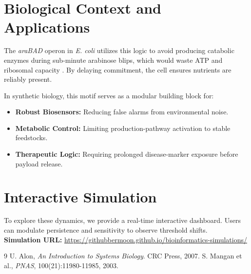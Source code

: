 \documentclass[11pt]{article}
\begin{document}
\section{Biological Context and Applications}
The \textit{araBAD} operon in \textit{E. coli} utilizes this logic to avoid producing catabolic enzymes during sub-minute arabinose blips, which would waste ATP and ribosomal capacity \cite{mangan2003}. By delaying commitment, the cell ensures nutrients are reliably present. 

In synthetic biology, this motif serves as a modular building block for:
\begin{itemize}
    \item \textbf{Robust Biosensors:} Reducing false alarms from environmental noise.
    \item \textbf{Metabolic Control:} Limiting production-pathway activation to stable feedstocks.
    \item \textbf{Therapeutic Logic:} Requiring prolonged disease-marker exposure before payload release.
\end{itemize}

\section{Interactive Simulation}
To explore these dynamics, we provide a real-time interactive dashboard. Users can modulate persistence and sensitivity to observe threshold shifts. 
\\ \textbf{Simulation URL:} \url{https://githubbermoon.github.io/bioinformatics-simulations/}

\begin{thebibliography}{9}
 U. Alon, \emph{An Introduction to Systems Biology}. CRC Press, 2007.
 S. Mangan et al., \emph{PNAS}, 100(21):11980-11985, 2003.
\end{thebibliography}
\end{document}

